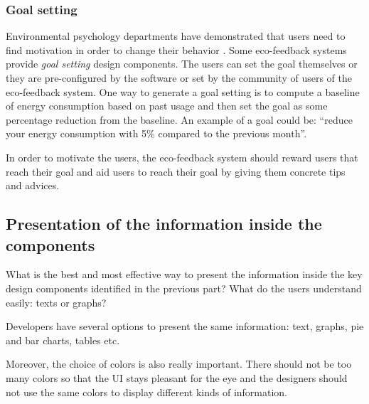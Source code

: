 \documentclass[journal]{vgtc}                %
\begin{document}
\subsubsection{Goal setting}
Environmental psychology departments have demonstrated that users need to find motivation in order to change their behavior \cite{abrahamse2007effect}.
Some eco-feedback systems provide \textit{goal setting} design components. The users can set the goal themselves or they are pre-configured by the software or set by the community of users of the eco-feedback system.  %
One way to generate a goal setting is to compute a baseline of energy consumption based on past usage and then set the goal as some percentage reduction from the baseline. %
An example of a goal could be: ``reduce your energy consumption with 5\% compared to the previous month''.

In order to motivate the users, the eco-feedback system should reward users that reach their goal and aid users to reach their goal by giving them concrete tips and advices.



\subsection{Presentation of the information inside the components} %

What is the best and most effective way to present the information inside the key design components identified in the previous part? What do the users understand easily: texts or graphs?

Developers have several options to present the same information: text, graphs, pie and bar charts, tables etc.

Moreover, the choice of colors is also really important. There should not be too many colors so that the UI stays pleasant for the eye and the designers should not use the same colors to display different kinds of information.
\end{document}
